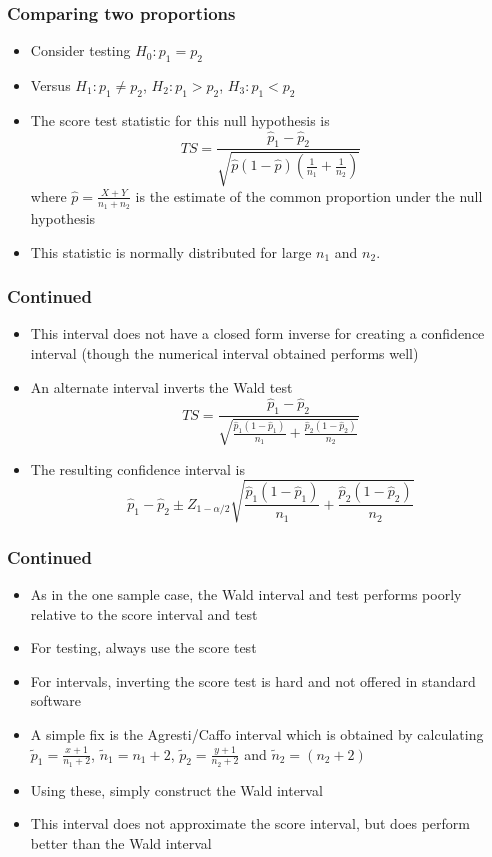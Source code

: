 \documentclass[aspectratio=169]{beamer}
\begin{document}
\begin{frame}\frametitle{Comparing two proportions}
  \begin{itemize}
  \item Consider testing $H_0:p_1 = p_2$ 
  \item Versus $H_1:p_1 \neq p_2$, $H_2:p_1>p_2$, $H_3:p_1 < p_2$ 
  \item The score test statistic for this null hypothesis is
    $$
    TS = \frac{\hat p_1 - \hat p_2}{\sqrt{\hat p (1 - \hat p)(\frac{1}{n_1} + \frac{1}{n_2})}}
    $$
    where $\hat p = \frac{X + Y}{n_1 + n_2}$ is the estimate of the
    common proportion under the null hypothesis
  \item This statistic is normally distributed for large $n_1$ and
    $n_2$.
  \end{itemize}
\end{frame}

\begin{frame}\frametitle{Continued}
  \begin{itemize}
  \item This interval does not have a closed form inverse for creating a
    confidence interval (though the numerical interval obtained performs
    well)
  \item An alternate interval inverts the Wald test
    $$
    TS = \frac{\hat p_1 - \hat p_2}{\sqrt{\frac{\hat p_1 (1 - \hat p_1)}{n_1} + \frac{\hat p_2(1 - \hat p_2)}{n_2}}}
    $$
  \item The resulting confidence interval is
    $$
    \hat p_1 - \hat p_2 \pm Z_{1-\alpha / 2}\sqrt{\frac{\hat p_1 (1 - \hat p_1)}{n_1} + \frac{\hat p_2(1 - \hat p_2)}{n_2}}
    $$
    \end{itemize}
  \end{frame}

\begin{frame}\frametitle{Continued}
  \begin{itemize}
  \item As in the one sample case, the Wald interval and test performs poorly
    relative to the score interval and test
  \item For testing, always use the score test
  \item For intervals, inverting the score test is hard and not offered in standard software
  \item A simple fix is the Agresti/Caffo interval which is obtained by calculating $\tilde p_1 = \frac{x + 1}{n_1 + 2}$, $\tilde n_1 = n_1 + 2$, $\tilde p_2 = \frac{y + 1}{n_2 + 2}$ and $\tilde n_2 = (n_2 + 2)$
  \item Using these, simply construct the Wald interval  
  \item This interval does not approximate the score interval, but does
    perform better than the Wald interval
  \end{itemize}
\end{frame}
 
\end{document}
